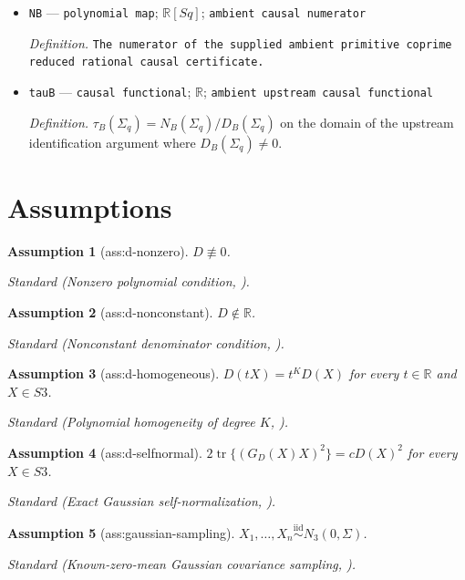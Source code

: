 \documentclass{article}
\newtheorem{assumption}{Assumption}
\begin{document}
\begin{itemize}
  \item \texttt{NB} --- \texttt{polynomial map}; \(\mathbb R[Sq]\); \texttt{ambient causal numerator}
  \par\smallskip\noindent\emph{Definition.} \texttt{The numerator of the supplied ambient primitive coprime reduced rational causal certificate.}
  \item \texttt{tauB} --- \texttt{causal functional}; \(\mathbb R\); \texttt{ambient upstream causal functional}
  \par\smallskip\noindent\emph{Definition.} \(\tau_B(\Sigma_q)=N_B(\Sigma_q)/D_B(\Sigma_q)\) on the domain of the upstream identification argument where \(D_B(\Sigma_q)\neq0\).
\end{itemize}

\section{Assumptions}

\begin{assumption}[ass:d-nonzero]\label{ass:d-nonzero}
\(D\not\equiv0\).
\par\smallskip\noindent\emph{Standard} (Nonzero polynomial condition, \cite{Tamano2026SelfNormalizing}).
\end{assumption}

\begin{assumption}[ass:d-nonconstant]\label{ass:d-nonconstant}
\(D\notin\mathbb R\).
\par\smallskip\noindent\emph{Standard} (Nonconstant denominator condition, \cite{Tamano2026SelfNormalizing}).
\end{assumption}

\begin{assumption}[ass:d-homogeneous]\label{ass:d-homogeneous}
\(D(tX)=t^K D(X)\) for every \(t\in\mathbb R\) and \(X\in S3\).
\par\smallskip\noindent\emph{Standard} (Polynomial homogeneity of degree \(K\), \cite{Tamano2026SelfNormalizing}).
\end{assumption}

\begin{assumption}[ass:d-selfnormal]\label{ass:d-selfnormal}
\(2\operatorname{tr}\{(G_D(X)X)^2\}=cD(X)^2\) for every \(X\in S3\).
\par\smallskip\noindent\emph{Standard} (Exact Gaussian self-normalization, \cite{Tamano2026SelfNormalizing}).
\end{assumption}

\begin{assumption}[ass:gaussian-sampling]\label{ass:gaussian-sampling}
\(X_1,\ldots,X_n\stackrel{\mathrm{iid}}{\sim}N_3(0,\Sigma)\).
\par\smallskip\noindent\emph{Standard} (Known-zero-mean Gaussian covariance sampling, \cite{Muirhead1982Multivariate}).
\end{assumption}
\end{document}

